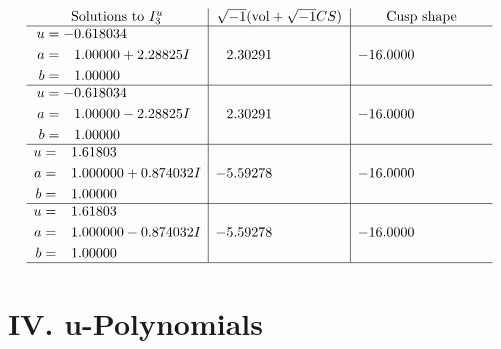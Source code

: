 \documentclass[1p]{elsarticle_modified}
\theoremstyle{definition}
\newcommand{\I}{\sqrt{-1}}
\begin{document}
$$\begin{array}{c|c|c}  
\text{Solutions to }I^u_{3}& \I (\text{vol} + \sqrt{-1}CS) & \text{Cusp shape}\\
 \hline 
\begin{aligned}
u &= -0.618034\phantom{ +0.000000I} \\
a &= \phantom{-}1.00000 + 2.28825 I \\
b &= \phantom{-}1.00000\phantom{ +0.000000I}\end{aligned}
 & \phantom{-}2.30291\phantom{ +0.000000I} & -16.0000\phantom{ +0.000000I} \\ \hline\begin{aligned}
u &= -0.618034\phantom{ +0.000000I} \\
a &= \phantom{-}1.00000 - 2.28825 I \\
b &= \phantom{-}1.00000\phantom{ +0.000000I}\end{aligned}
 & \phantom{-}2.30291\phantom{ +0.000000I} & -16.0000\phantom{ +0.000000I} \\ \hline\begin{aligned}
u &= \phantom{-}1.61803\phantom{ +0.000000I} \\
a &= \phantom{-}1.000000 + 0.874032 I \\
b &= \phantom{-}1.00000\phantom{ +0.000000I}\end{aligned}
 & -5.59278\phantom{ +0.000000I} & -16.0000\phantom{ +0.000000I} \\ \hline\begin{aligned}
u &= \phantom{-}1.61803\phantom{ +0.000000I} \\
a &= \phantom{-}1.000000 - 0.874032 I \\
b &= \phantom{-}1.00000\phantom{ +0.000000I}\end{aligned}
 & -5.59278\phantom{ +0.000000I} & -16.0000\phantom{ +0.000000I}\\
 \hline 
 \end{array}$$\newpage
\newpage\renewcommand{\arraystretch}{1}
\centering \section*{ IV. u-Polynomials}
\end{document}
